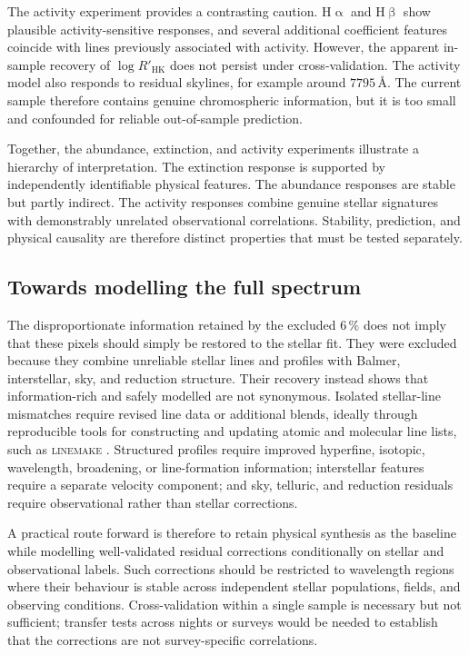 \documentclass[twocolumn,apj,numberedappendix,appendixfloats]{openjournal}
\begin{document}
The activity experiment provides a contrasting caution. $\mathrm{H}\upalpha$ and $\mathrm{H}\upbeta$ show plausible activity-sensitive responses, and several additional coefficient features coincide with lines previously associated with activity. However, the apparent in-sample recovery of $\log R'_\mathrm{HK}$ does not persist under cross-validation. The activity model also responds to residual skylines, for example around $7795\,\text{\AA}$. The current sample therefore contains genuine chromospheric information, but it is too small and confounded for reliable out-of-sample prediction.

Together, the abundance, extinction, and activity experiments illustrate a hierarchy of interpretation. The extinction response is supported by independently identifiable physical features. The abundance responses are stable but partly indirect. The activity responses combine genuine stellar signatures with demonstrably unrelated observational correlations. Stability, prediction, and physical causality are therefore distinct properties that must be tested separately.

\subsection{Towards modelling the full spectrum}
\label{sec:discussion_full_spectrum}

The disproportionate information retained by the excluded $6\,\mathrm{\%}$ does not imply that these pixels should simply be restored to the stellar fit. They were excluded because they combine unreliable stellar lines and profiles with Balmer, interstellar, sky, and reduction structure. Their recovery instead shows that information-rich and safely modelled are not synonymous. Isolated stellar-line mismatches require revised line data or additional blends, ideally through reproducible tools for constructing and updating atomic and molecular line lists, such as \textsc{linemake} \citep{linemake}. Structured profiles require improved hyperfine, isotopic, wavelength, broadening, or line-formation information; interstellar features require a separate velocity component; and sky, telluric, and reduction residuals require observational rather than stellar corrections.

A practical route forward is therefore to retain physical synthesis as the baseline while modelling well-validated residual corrections conditionally on stellar and observational labels. Such corrections should be restricted to wavelength regions where their behaviour is stable across independent stellar populations, fields, and observing conditions. Cross-validation within a single sample is necessary but not sufficient; transfer tests across nights or surveys would be needed to establish that the corrections are not survey-specific correlations.
\end{document}
